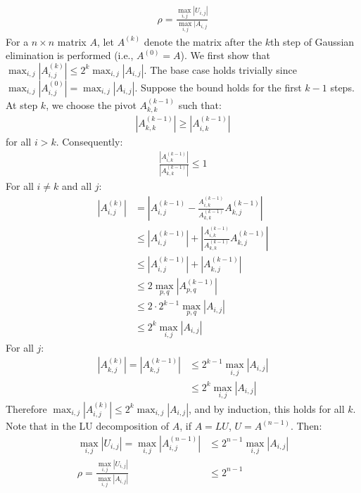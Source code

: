 \documentclass{article}
\begin{document}
\clearpage
\problem{}
\begin{align*}
    \rho = \frac{\max_{i,j}|U_{i,j}|}{\max_{i,j}|A_{i,j}}
\end{align*}
For a $n \times n$ matrix $A$, let $A^{(k)}$ denote the matrix after the $k$th step of Gaussian elimination is performed (i.e., $A^{(0)} = A$). We first show that $\max_{i,j}|A^{(k)}_{i,j}| \leq 2^k \max_{i,j}|A_{i,j}|$. The base case holds trivially since $\max_{i,j}|A^{(0)}_{i,j}| = \max_{i,j}|A_{i,j}|$. Suppose the bound holds for the first $k - 1$ steps. At step $k$, we choose the pivot $A^{(k-1)}_{k,k}$ such that:
\begin{align*}
    |A^{(k-1)}_{k,k}| \geq |A^{(k-1)}_{i,k}| 
\end{align*}
for all $i > k$. Consequently:
\begin{align*}
    \frac{|A^{(k-1)}_{i,k}|}{|A^{(k-1)}_{k,k}|} \leq 1
\end{align*}
For all $i \neq k$ and all $j$:
\begin{align*}
    |A^{(k)}_{i,j}| & = \left|A^{(k-1)}_{i,j} - \frac{A^{(k-1)}_{i,k}}{A^{(k-1)}_{k,k}}A^{(k-1)}_{k,j}\right| \\
    & \leq |A^{(k-1)}_{i,j}| + \left|\frac{A^{(k-1)}_{i,k}}{A^{(k-1)}_{k,k}}A^{(k-1)}_{k,j}\right| \\
    & \leq |A^{(k-1)}_{i,j}| + |A^{(k-1)}_{k,j}| \\
    & \leq 2\max_{p,q} |A^{(k-1)}_{p,q}| \\
    & \leq 2 \cdot 2^{k-1}\max_{p,q}|A_{i,j}| \\
    & \leq 2^k\max_{i,j}|A_{i,j}|
\end{align*}
For all $j$:
\begin{align*}
    |A^{(k)}_{k,j}| = |A^{(k-1)}_{k,j}| & \leq 2^{k-1}\max_{i,j}|A_{i,j}| \\
    & \leq 2^k\max_{i,j}|A_{i,j}|
\end{align*}
Therefore $\max_{i,j}|A^{(k)}_{i,j}| \leq 2^k \max_{i,j}|A_{i,j}|$, and by induction, this holds for all $k$. Note that in the LU decomposition of $A$, if $A = LU$, $U = A^{(n - 1)}$. Then:
\begin{align*}
    \max_{i,j}|U_{i,j}| = \max_{i,j}|A^{(n-1)}_{i,j}| & \leq 2^{n-1}\max_{i,j}|A_{i,j}| \\
    \rho = \frac{\max_{i,j}|U_{i,j}|}{\max_{i,j}|A_{i,j}|} & \leq 2^{n-1}
\end{align*}
\end{document}
